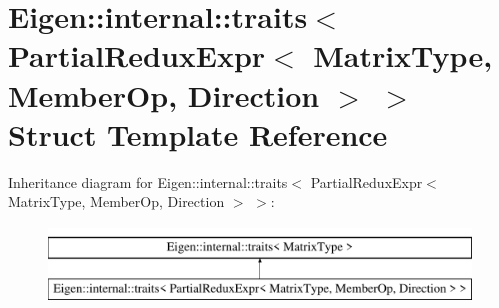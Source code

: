 \hypertarget{struct_eigen_1_1internal_1_1traits_3_01_partial_redux_expr_3_01_matrix_type_00_01_member_op_00_01_direction_01_4_01_4}{}\section{Eigen\+::internal\+::traits$<$ Partial\+Redux\+Expr$<$ Matrix\+Type, Member\+Op, Direction $>$ $>$ Struct Template Reference}
\label{struct_eigen_1_1internal_1_1traits_3_01_partial_redux_expr_3_01_matrix_type_00_01_member_op_00_01_direction_01_4_01_4}
Inheritance diagram for Eigen\+::internal\+::traits$<$ Partial\+Redux\+Expr$<$ Matrix\+Type, Member\+Op, Direction $>$ $>$\+:\begin{figure}[H]
\begin{center}
\leavevmode
\includegraphics[height=2.000000cm]{struct_eigen_1_1internal_1_1traits_3_01_partial_redux_expr_3_01_matrix_type_00_01_member_op_00_01_direction_01_4_01_4}
\end{center}
\end{figure}
